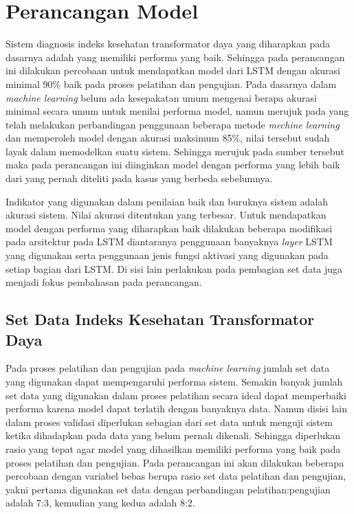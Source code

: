 \section{Perancangan Model}

Sistem diagnosis indeks kesehatan transformator daya yang diharapkan pada dasarnya adalah yang memiliki performa yang baik. Sehingga pada perancangan ini dilakukan percobaan untuk mendapatkan model dari LSTM dengan akurasi minimal 90\% baik pada proses pelatihan dan pengujian. Pada dasarnya dalam \textit{machine learning} belum ada kesepakatan umum mengenai berapa akurasi minimal secara umum untuk menilai performa model, namun merujuk pada \cite{dwivedi2018performance} yang telah melakukan perbandingan penggunaan beberapa metode \textit{mechine learning} dan memperoleh model dengan akurasi maksimum 85\%, nilai tersebut sudah layak dalam memodelkan suatu sistem. Sehingga merujuk pada sumber tersebut maka pada perancangan ini diinginkan model dengan performa yang lebih baik dari yang pernah diteliti pada kasus yang berbeda sebelumnya.

Indikator yang digunakan dalam penilaian baik dan buruknya sistem adalah akurasi sistem. Nilai akurasi ditentukan yang terbesar. Untuk mendapatkan model dengan performa yang diharapkan baik dilakukan beberapa modifikasi pada arsitektur pada LSTM diantaranya penggunaan banyaknya \textit{layer} LSTM yang digunakan serta penggunaan jenis fungsi aktivasi yang digunakan pada setiap bagian dari LSTM. Di sisi lain perlakukan pada pembagian set data juga menjadi fokus pembahasan pada perancangan.

\subsection{Set Data Indeks Kesehatan Transformator Daya}
Pada proses pelatihan dan pengujian pada \textit{machine learning} jumlah set data yang digunakan dapat mempengaruhi performa sistem. Semakin banyak jumlah set data yang digunakan dalam proses pelatihan secara ideal dapat memperbaiki performa karena model dapat terlatih dengan banyaknya data. Namun disisi lain dalam proses validasi diperlukan sebagian dari set data untuk menguji sistem ketika dihadapkan pada data yang belum pernah dikenali. Sehingga diperlukan rasio yang tepat agar model yang dihasilkan memiliki performa yang baik pada proses pelatihan dan pengujian. Pada perancangan ini akan dilakukan beberapa percobaan dengan variabel bebas berupa rasio set data pelatihan dan pengujian, yakni pertama digunakan set data dengan perbandingan pelatihan:pengujian adalah 7:3, kemudian yang kedua adalah 8:2. 

